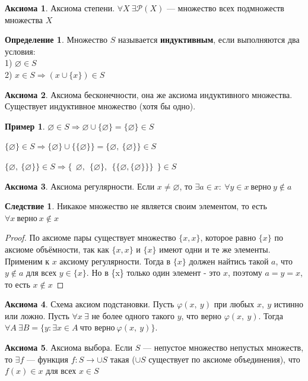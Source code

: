 \documentclass[12pt,oneside]{article}
\theoremstyle{definition}
\newtheorem{definition}{Определение}
\newtheorem{axiom}{Аксиома}[section]
\newtheorem{exmp}{Пример}[section]
\newtheorem{corollary}{Следствие}[section]
\begin{document}
    \begin{axiom}{Аксиома степени.} $\forall X\ \exists\mathcal{P}(X)$ --- множество всех подмножеств множества $X$
    \end{axiom} 
    \begin{definition}
        Множество $S$ называется \textbf{индуктивным}, если выполняются два условия:
        \\1) $\varnothing\in S$
        \\2) $x\in S \Longrightarrow (x\cup\{x\})\in S$
    \end{definition}
    \begin{axiom}{ Аксиома бесконечности, она же аксиома индуктивного множества.} Существует индуктивное множество (хотя бы одно).
    \end{axiom}
    
    \begin{exmp}
    $\varnothing\in S \Longrightarrow \varnothing\cup\{\varnothing\} = \{\varnothing\}\in S$
    
    $\{\varnothing\}\in S \Longrightarrow \{\varnothing\}\cup \{\{\varnothing\}\} = \{\varnothing,\ \{\varnothing\}\}\in S$
    
    $\{\varnothing,\ \{\varnothing\}\}\in S \Longrightarrow \{\ \ \varnothing,\ \ \{\varnothing\},\ \ \{\{\varnothing, \{\varnothing\}\}\}\ \ \}\in S $
    \end{exmp}
    
    \begin{axiom}{Аксиома регулярности.} Если $x\neq \varnothing$, то $\exists a\in x:\ \forall y\in x\ \textrm{верно}\ y\notin a$
    \end{axiom} 
    
    \begin{corollary}\label{x_notin_x}
    Никакое множество не является своим элементом, то есть $\forall x\ \textrm{верно}\ x\notin x$
    \begin{proof}
    По аксиоме пары существует множество $\{x, x\}$, которое равно $\{x\}$ по аксиоме объёмности, так как $\{x, x\}$ и $\{x\}$ имеют одни и те же элементы. Применим к $x$ аксиому регулярности. Тогда в $\{x\}$ должен найтись такой $a$, что $y\notin a$ для всех $y\in\{x\}$. Но в \{x\} только один элемент - это $x$, поэтому $a=y=x$, то есть $x\notin x$
    \end{proof}
    \end{corollary}
    
    \begin{axiom}{Схема аксиом подстановки.} Пусть $\varphi(x,\ y)$ при любых $x,\ y$ истинно или ложно. Пусть $\forall x\ \exists$ не более одного такого $y$, что верно $\varphi(x,\ y)$. Тогда $\forall A\ \exists B=\{y: \exists x\in A\ \textrm{что верно}\ \varphi(x,\ y)\}$.
    \end{axiom}
    \begin{axiom}{Аксиома выбора.} Если $S$ --- непустое множество непустых множеств, то $\exists f$ --- функция $f\colon S\to \cup S$ такая ($\cup S$ существует по аксиоме объединения), что $f(x)\in x$ для всех $x\in S$
    \end{axiom}
\end{document}
